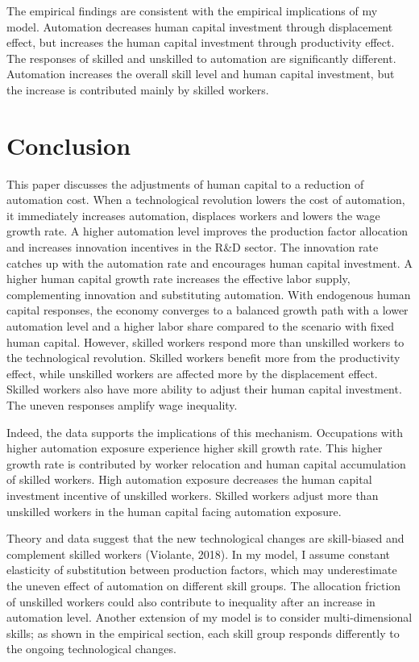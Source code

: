 \documentclass[12pt]{article}
\begin{document}
The empirical findings are consistent with the empirical implications of my model. Automation decreases human capital investment through displacement effect, but increases the human capital investment through productivity effect. The responses of skilled and unskilled to automation are significantly different. Automation increases the overall skill level and human capital investment, but the increase is contributed mainly by skilled workers. 
\section{Conclusion}

This paper discusses the adjustments of human capital to a reduction of automation cost. When a technological revolution lowers the cost of automation, it immediately increases automation, displaces workers and lowers the wage growth rate. A higher automation level improves the production factor allocation and increases innovation incentives in the R\&D sector. The innovation rate catches up with the automation rate and encourages human capital investment. A higher human capital growth rate increases the effective labor supply, complementing innovation and substituting automation. With endogenous human capital responses, the economy converges to a balanced growth path with a lower automation level and a higher labor share compared to the scenario with fixed human capital. However, skilled workers respond more than unskilled workers to the technological revolution. Skilled workers benefit more from the productivity effect, while unskilled workers are affected more by the displacement effect. Skilled workers also have more ability to adjust their human capital investment. The uneven responses amplify wage inequality.

Indeed, the data supports the implications of this mechanism. Occupations with higher automation exposure experience higher skill growth rate. This higher growth rate is contributed by worker relocation and human capital accumulation of skilled workers. High automation exposure decreases the human capital investment incentive of unskilled workers. Skilled workers adjust more than unskilled workers in the human capital facing automation exposure. 

Theory and data suggest that the new technological changes are skill-biased and complement skilled workers (Violante, 2018\nocite{Violante2008}). In my model, I assume constant elasticity of substitution between production factors, which may underestimate the uneven effect of automation on different skill groups. The allocation friction of unskilled workers could also contribute to inequality after an increase in automation level. Another extension of my model is to consider multi-dimensional skills; as shown in the empirical section, each skill group responds differently to the ongoing technological changes. 
\end{document}
